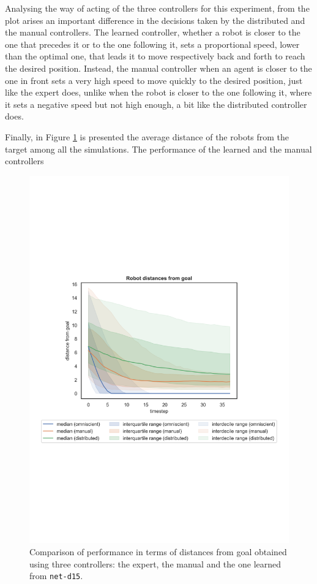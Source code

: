 Analysing the way of acting of the three controllers for this experiment, from 
the plot arises an important difference in the decisions taken by the distributed 
and the manual controllers.
The learned controller, whether a robot is closer to the one that precedes it 
or to the one following it, sets a proportional speed, lower than the optimal one, 
that leads it to move respectively back and forth to reach the desired position.
Instead, the manual controller when an agent is closer to the one in front 
sets a very high speed to move quickly to the desired position, just like the expert 
does, unlike when the robot is closer to the one following it, where it sets a 
negative speed but not high enough, a bit like the distributed controller does.

Finally, in Figure \ref{fig:net-d15distance} is presented the average distance of 
the robots from the target among all the simulations. The performance of the 
learned and the manual controllers 
\begin{figure}[!htb]
	\centering
	\includegraphics[width=.65\textwidth]{contents/images/net-d15/distances-from-goal-compressed-distributed}%
	\caption[Evaluation of \texttt{net-d15} distances from goal.]{Comparison 
	of performance in terms of distances from goal obtained using three 
	controllers: the expert, the manual and the one learned from \texttt{net-d15}.}
	\label{fig:net-d15distance}
\end{figure}

